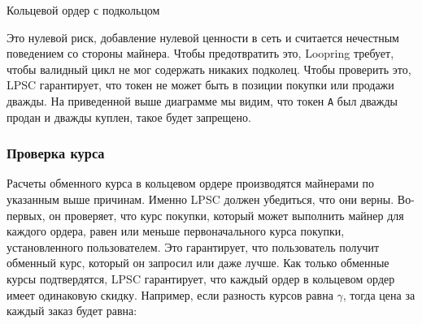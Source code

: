 \documentclass[utf8,nofonts]{article}
\makeatletter
\newenvironment{figurehere}
 {\def\@captype{figure}}
 {}
\makeatother
\begin{document}
\begin{multicols}{2}
\begin{center}
\begin{figurehere}
			
			\caption{Кольцевой ордер с подкольцом}
			\label{fig:subring}
		\end{figurehere}
	\end{center}
	
	Это нулевой риск, добавление нулевой ценности в сеть и считается нечестным поведением со стороны майнера. Чтобы предотвратить это, Loopring требует, чтобы валидный цикл не мог содержать никаких подколец. Чтобы проверить это, LPSC гарантирует, что токен не может быть в позиции покупки или продажи дважды. На приведенной выше диаграмме мы видим, что токен \verb|A| был дважды продан и дважды куплен, такое будет запрещено. 
	
	
	\subsubsection{Проверка курса\label{sec:fill_rate_check}}
	
	
	Расчеты обменного курса в кольцевом ордере производятся майнерами по указанным выше причинам. Именно LPSC должен убедиться, что они верны. Во-первых, он проверяет, что курс покупки, который может выполнить майнер для каждого ордера, равен или меньше первоначального курса покупки, установленного пользователем. Это гарантирует, что пользователь получит обменный курс, который он запросил или даже лучше. Как только обменные курсы подтвердятся, LPSC гарантирует, что каждый ордер в кольцевом ордер имеет одинаковую скидку. Например, если разность курсов равна $ \gamma $, тогда цена за каждый заказ будет равна:
	

\end{multicols}
\end{document}
